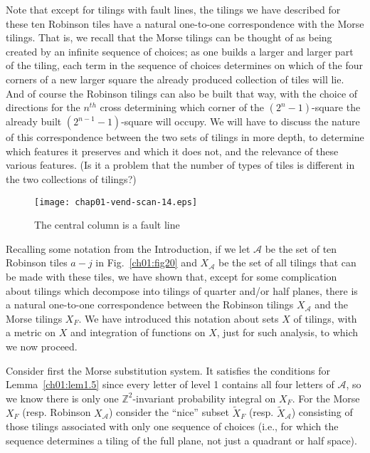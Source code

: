 \documentclass[reqno]{stml-l}
\theoremstyle{plain}
\theoremstyle{definition}
\numberwithin{equation}{chapter}
\begin{document}
Note that except for tilings with fault lines, the tilings we have described for these ten Robinson tiles have a natural one-to-one correspondence with the Morse tilings. That is, we recall that the Morse tilings can be thought of as being created by an infinite sequence of choices; as one builds a larger and larger part of the tiling, each term in the sequence of choices determines on which of the four corners of a new larger square the already produced collection of tiles will lie. And of course the Robinson tilings can also be built that way, with the choice of directions for the $n^{th}$ cross determining which corner of the $(2^{n}-1)$-square the already built $(2^{n-1}-1)$-square will occupy. We will have to discuss the nature of this correspondence between the two sets of tilings in more depth, to determine which features it
preserves and which it does not, and the relevance of these various features. (Is it a problem that the number of types of tiles is different in the two collections of tilings?)

\begin{figure}[!h]
\texttt{[image: chap01-vend-scan-14.eps]}
\caption{The central column is a fault line }\label{ch01:fig27}
\end{figure}

Recalling some notation from the Introduction, if we let $\mathcal{A}$ be the set of ten Robinson tiles $a-j$ in Fig.~\ref{ch01:fig20} and $X_{\mathcal{A}}$ be the set of all tilings that can be made with these tiles, we have shown that, except for some complication about tilings which decompose into tilings of quarter and/or half planes, there is a natural one-to-one correspondence between the Robinson tilings $X_{\mathcal{A}}$ and the Morse tilings $X_{F}$. We have introduced this notation about sets $X$ of tilings, with a metric on $X$ and integration of functions on $X$, just for such analysis, to which we now proceed.

Consider first the Morse substitution system. It satisfies the conditions for Lemma~\ref{ch01:lem1.5} since every letter of level 1 contains all four
letters of $\mathcal{A}$, so we know there is only one $\mathbb{Z}^{2}$-invariant probability integral on $X_{F}$. For the Morse $X_{F}$ (resp. Robinson $X_{\mathcal{A}}$) consider the ``nice'' subset $\tilde{X}_{F}$ (resp. $\tilde{X}_{\mathcal{A}}$) consisting of those tilings associated with only one sequence of choices (i.e., for which the sequence determines a tiling of the full plane, not just a quadrant or half space).
\end{document}

